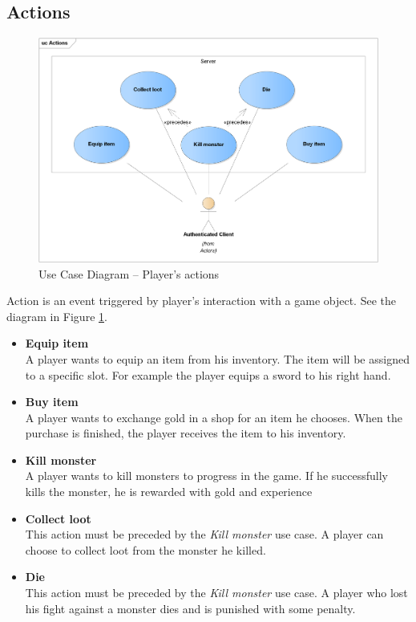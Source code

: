 	\subsection{Actions}	
		\begin{figure}[h]	
			\includegraphics[width=\textwidth]{figures/UC_Actions}
			\centering			
			\caption{Use Case Diagram -- Player's actions}
			\label{fig:ucactions}
		\end{figure}
		\noindent Action is an event triggered by player's interaction with a game object. See the diagram in Figure \ref{fig:ucactions}.
		
		\begin{itemize}
			\item \textbf{Equip item} \\
			A player wants to equip an item from his inventory. The item will be assigned to a specific slot. For example the player equips a sword to his right hand.
			
			\item \textbf{Buy item} \\
			A player wants to exchange gold in a shop for an item he chooses. When the purchase is finished, the player receives the item to his inventory.
			
			\item \textbf{Kill monster} \\
			A player wants to kill monsters to progress in the game. If he successfully kills the monster, he is rewarded with gold and experience
			
			\item \textbf{Collect loot} \\
			This action must be preceded by the \textit{Kill monster} use case. A player can choose to collect loot from the monster he killed.
			
			\item \textbf{Die} \\
			This action must be preceded by the \textit{Kill monster} use case. A player who lost his fight against a monster dies and is punished with some penalty.		
		\end{itemize}
	
